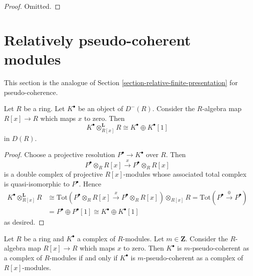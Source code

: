 \begin{proof}
Omitted.
\end{proof}






\section{Relatively pseudo-coherent modules}
\label{section-relative-pseudo-coherent}

\noindent
This section is the analogue of
Section \ref{section-relative-finite-presentation}
for pseudo-coherence.

\begin{lemma}
\label{lemma-pull-push}
Let $R$ be a ring. Let $K^\bullet$ be an object of $D^{-}(R)$.
Consider the $R$-algebra map $R[x] \to R$ which maps $x$ to zero. Then
$$
K^\bullet \otimes_{R[x]}^{\mathbf{L}} R \cong K^\bullet \oplus K^\bullet[1]
$$
in $D(R)$.
\end{lemma}

\begin{proof}
Choose a projective resolution $P^\bullet \to K^\bullet$ over $R$.
Then
$$
P^\bullet \otimes_R R[x] \xrightarrow{x} P^\bullet \otimes_R R[x]
$$
is a double complex of projective $R[x]$-modules whose associated
total complex is quasi-isomorphic to $P^\bullet$. Hence
\begin{align*}
K^\bullet \otimes_{R[x]}^{\mathbf{L}} R
& \cong
\text{Tot}(P^\bullet \otimes_R R[x] \xrightarrow{x} P^\bullet \otimes_R R[x])
\otimes_{R[x]} R =
\text{Tot}(P^\bullet \xrightarrow{0} P^\bullet) \\
& = P^\bullet \oplus P^\bullet[1] \cong K^\bullet \oplus K^\bullet[1]
\end{align*}
as desired.
\end{proof}

\begin{lemma}
\label{lemma-add-variable-pseudo-coherent}
Let $R$ be a ring and $K^\bullet$ a complex of $R$-modules.
Let $m \in \mathbf{Z}$. Consider the $R$-algebra map $R[x] \to R$
which maps $x$ to zero. Then $K^\bullet$ is $m$-pseudo-coherent as
a complex of $R$-modules if and only if $K^\bullet$ is $m$-pseudo-coherent
as a complex of $R[x]$-modules.
\end{lemma}

